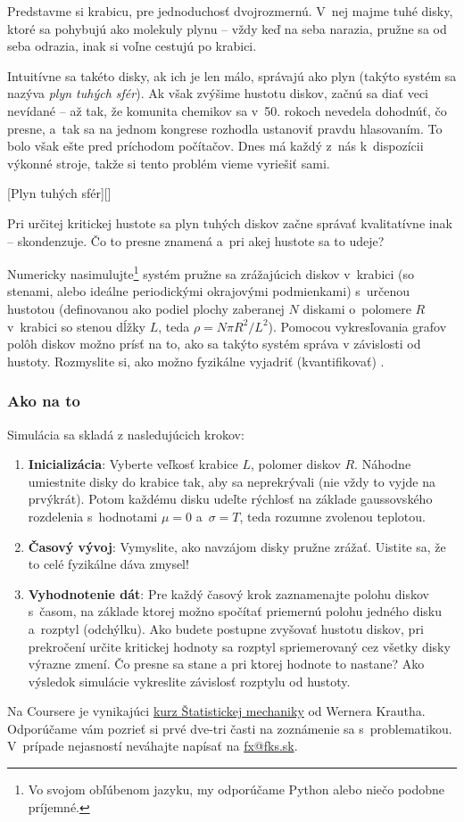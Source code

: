 Predstavme si krabicu, pre jednoduchosť dvojrozmernú. V~nej majme tuhé disky,
ktoré sa pohybujú ako molekuly plynu -- vždy keď na seba narazia, pružne sa od seba odrazia,
inak si voľne cestujú po krabici. 

Intuitívne sa takéto disky, ak ich je len málo, správajú ako plyn (takýto systém sa nazýva \emph{plyn tuhých sfér}). 
Ak však zvýšime hustotu diskov, začnú sa diať veci nevídané -- až tak, že komunita chemikov sa v~50. rokoch
nevedela dohodnúť, čo presne, a~tak sa na jednom kongrese rozhodla ustanoviť pravdu hlasovaním.
To bolo však ešte pred príchodom počítačov. Dnes má každý z~nás k~dispozícii výkonné stroje,
takže si tento problém vieme vyriešiť sami.

[Plyn tuhých sfér][]

Pri určitej kritickej hustote sa plyn tuhých diskov začne správať kvalitatívne inak -- skondenzuje.
Čo to presne znamená a~pri akej hustote sa to udeje?

Numericky nasimulujte\footnote{Vo svojom obľúbenom jazyku, my odporúčame Python alebo niečo podobne príjemné.}
systém pružne sa zrážajúcich diskov v~krabici (so stenami, alebo ideálne periodickými okrajovými podmienkami)
s~určenou hustotou (definovanou ako podiel plochy zaberanej $N$ diskami o~polomere $R$ v~krabici so stenou dĺžky $L$,
teda  $\rho = N\pi R^2/L^2$). Pomocou vykresľovania grafov polôh diskov možno prísť na to,
ako sa takýto systém správa v závislosti od hustoty. Rozmyslite si,
ako možno fyzikálne vyjadriť (kvantifikovať) .

\subsubsection{Ako na to}
Simulácia sa skladá z nasledujúcich krokov:
\begin{enumerate}[label=\alph*)]
	\item \textbf{Inicializácia}: Vyberte veľkosť krabice $L$, polomer diskov $R$.
		Náhodne umiestnite disky do krabice tak, aby sa neprekrývali (nie vždy to vyjde na prvýkrát).
		Potom každému disku udeľte rýchlosť na základe gaussovského rozdelenia s~hodnotami $\mu=0$ a~$\sigma = T$,
		teda rozumne zvolenou teplotou.
	\item \textbf{Časový vývoj}: Vymyslite, ako navzájom disky pružne zrážať.
		Uistite sa, že to celé fyzikálne dáva zmysel!
	\item \textbf{Vyhodnotenie dát}: Pre každý časový krok zaznamenajte polohu diskov s~časom,
		na základe ktorej možno spočítať priemernú polohu jedného disku a~rozptyl (odchýlku).
		Ako budete postupne zvyšovať hustotu diskov, pri prekročení určite kritickej hodnoty sa
		rozptyl spriemerovaný cez všetky disky výrazne zmení. Čo presne sa stane a pri ktorej hodnote to nastane?
		Ako výsledok simulácie vykreslite závislosť rozptylu od hustoty.
\end{enumerate}

Na Coursere je vynikajúci \href{https://www.coursera.org/course/smac}{kurz Štatistickej mechaniky}
od Wernera Krautha. Odporúčame vám pozrieť si prvé dve-tri časti na zoznámenie sa s~problematikou.
V~prípade nejasností neváhajte napísať na \url{fx@fks.sk}.
